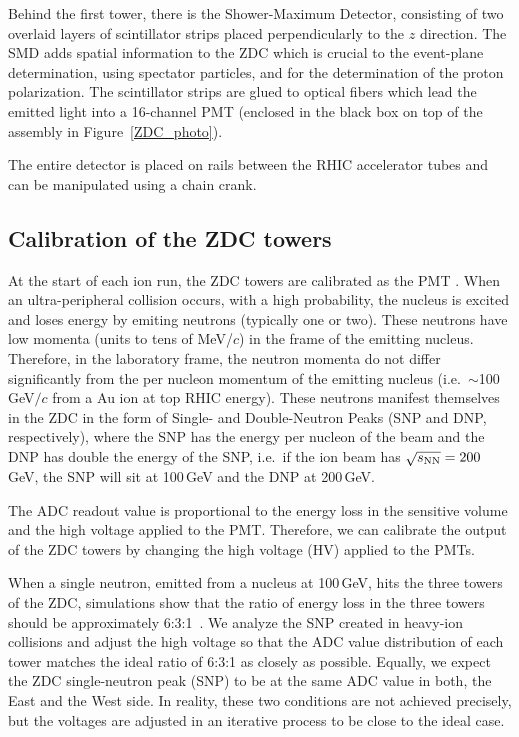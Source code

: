 Behind the first tower, there is the Shower-Maximum Detector, consisting of two overlaid layers of scintillator strips placed perpendicularly to the $z$ direction. The SMD adds spatial information to the ZDC which is crucial to the event-plane determination, using spectator particles, and for the determination of the proton polarization\@. The scintillator strips are glued to optical fibers which lead the emitted light into a 16-channel PMT (enclosed in the black box on top of the assembly in Figure~\ref{ZDC_photo})\@.

The entire detector is placed on rails between the RHIC accelerator tubes and can be manipulated using a chain crank.

\subsection{Calibration of the ZDC towers\label{ZDCcalibration}}
At the start of each ion run, the ZDC towers are calibrated as the PMT . When an ultra-peripheral
collision occurs, with a high probability, the nucleus is excited and loses energy by emiting neutrons
(typically one or two). These neutrons have low momenta (units to tens of MeV/$c$) in the frame of the emitting nucleus. Therefore, in the laboratory frame, the neutron momenta do not differ significantly from the per nucleon momentum of the emitting nucleus (i.e.\ $\sim$100$\,$GeV$/c$ from a Au ion at top RHIC energy). These neutrons manifest themselves in the ZDC in the form of Single- and Double-Neutron Peaks
(SNP and DNP, respectively),
where the SNP has the energy per nucleon of the beam and the DNP has double the energy of the SNP, i.e.\ if
the ion beam has $\sqrt{s_\text{NN}} = 200\,$GeV, the SNP will sit at 100$\,$GeV and the DNP at 200$\,$GeV\@.

The ADC readout value is proportional to the energy loss in the sensitive volume and the high voltage applied to the PMT\@. Therefore, we can calibrate the output of the ZDC towers by changing the high voltage (HV) applied to the PMTs. 

When a single neutron, emitted from a nucleus at 100$\,$GeV, hits the three towers of the ZDC, simulations show that the ratio of energy loss
in the three towers should be 
approximately 6:3:1~\cite{ZDCphysics}\@. We analyze the SNP created in heavy-ion collisions and adjust the high voltage so that the ADC value 
distribution of each tower matches the ideal ratio of 6:3:1 as closely as possible. Equally, we expect the ZDC 
single-neutron peak (SNP) to
be at the same ADC value in both, the East and the West side. In reality, these two conditions are not achieved precisely, but the voltages are adjusted in an iterative process to be close to the ideal case.



